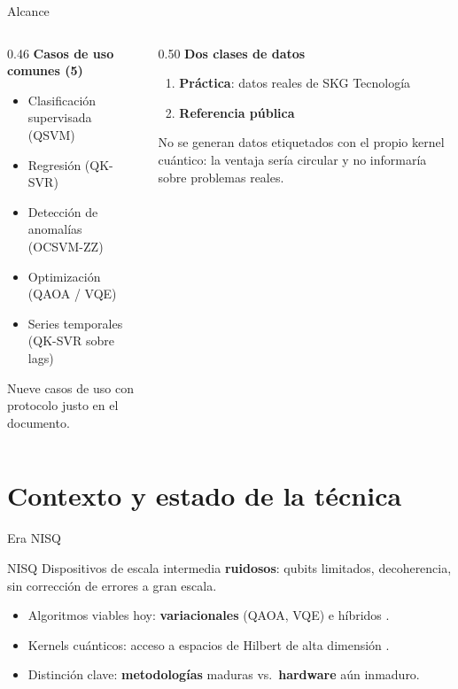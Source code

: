 \documentclass[aspectratio=169,10pt,professionalfonts]{beamer}
\begin{document}
\begin{frame}{Alcance}
\begin{columns}[T]
\begin{column}{0.46\textwidth}
\textbf{Casos de uso comunes (5)}
\begin{itemize}
  \item Clasificación supervisada (QSVM)
  \item Regresión (QK-SVR)
  \item Detección de anomalías (OCSVM-ZZ)
  \item Optimización (QAOA / VQE)
  \item Series temporales (QK-SVR sobre lags)
\end{itemize}
{\footnotesize Nueve casos de uso con protocolo justo en el documento.}
\end{column}
\begin{column}{0.50\textwidth}
\textbf{Dos clases de datos}
\begin{enumerate}
  \item \textbf{Práctica}: datos reales de SKG Tecnología
  \item \textbf{Referencia pública}
\end{enumerate}
{\footnotesize No se generan datos etiquetados con el propio kernel cuántico:
la ventaja sería circular y no informaría sobre problemas reales.}
\end{column}
\end{columns}
\end{frame}

\section{Contexto y estado de la técnica}
\begin{frame}{Era NISQ}
\begin{block}{NISQ \citep{preskill2018}}
Dispositivos de escala intermedia \textbf{ruidosos}: qubits limitados, decoherencia, sin corrección de errores a gran escala.
\end{block}
\begin{itemize}
  \item Algoritmos viables hoy: \textbf{variacionales} (QAOA, VQE) e híbridos \citep{farhi2014, cerezo2021}.
  \item Kernels cuánticos: acceso a espacios de Hilbert de alta dimensión \citep{schuld2021, huang2021}.
  \item Distinción clave: \textbf{metodologías} maduras vs.\ \textbf{hardware} aún inmaduro.
\end{itemize}
\end{frame}
\end{document}
